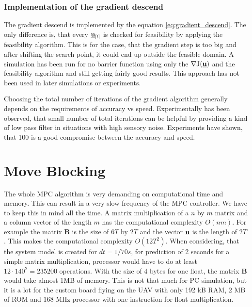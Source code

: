 \documentclass{article}
\newcommand{\uvec}{\textbf{\underline{u}}}
\newcommand{\macJ}{\mathrm{J}(\uvec)}
\begin{document}
\subsubsection{Implementation of the gradient descend}

The gradient descend is implemented by the equation \ref{eq:gradient_descend}. The only difference is, that every $\uvec_{[t]}$ is checked for feasibility by applying the feasibility algorithm. This is for the case, that the gradient step is too big and after shifting the search point, it could end up outside the feasible domain. A simulation has been run for no barrier function using only the $\nabla \macJ$ and the feasibility algorithm and still getting fairly good results. This approach has not been used in later simulations or experiments.

Choosing the total number of iterations of the gradient algorithm generally depends on the requirements of accuracy vs speed. Experimentally has been observed, that small number of total iterations can be helpful by providing a kind of low pass filter in situations with high sensory noise. Experiments have shown, that 100 is a good compromise between the accuracy and speed.

\section{Move Blocking}

The whole MPC algorithm is very demanding on computational time and memory. This can result in a very slow frequency of the MPC controller. We have to keep this in mind all the time. A matrix multiplication of a $n$ by $m$ matrix and a column vector of the length $m$ has the computational complexity $O(nm)$. For example the matrix $\textbf{\^B}$ is the size of $6T$ by $2T$ and the vector $\uvec$ is the length of $2T$. This makes the computational complexity $O(12T^2)$. When considering, that the system model is created for $dt = 1/70s$, for prediction of 2 seconds for a simple matrix multiplication, processor would have to do at least $12 \cdot  140^2 = 235 200$ operations. With the size of 4 bytes for one float, the matrix $\textbf{\^B}$ would take almost 1MB of memory. This is not that much for PC simulation, but it is a lot for the custom board flying on the UAV with only 192 kB RAM, 2 MB of ROM and 168 MHz processor with one instruction for float multiplication. 
\end{document}

